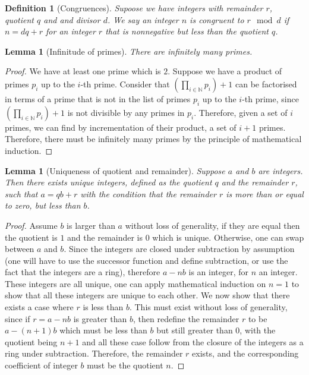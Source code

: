 \documentclass{tufte-book}
\newtheorem{definition}[theorem]{Definition}
\newtheorem{lemma}[theorem]{Lemma}
\begin{document}
\begin{definition}[Congruences]
	Supoose we have integers with remainder $r$, quotient $q$ and and divisor $d$.
	We say an integer $n$ is congruent to $r \mod d$ if $n = dq + r$ for an integer $r$ that is nonnegative but less than the quotient $q$.
\end{definition}

\begin{lemma}[Infinitude of primes]
	There are infinitely many primes.
\end{lemma}

\begin{proof}
	We have at least one prime which is $2$.
	Suppose we have a product of primes $p_{i}$ up to the $i$-th prime.
	Consider that $(\prod_{i \in \mathbb{N}} p_i) + 1$ can be factorised in terms
	of a prime that is not in the list of primes $p_{i}$ up to the $i$-th prime, since 
	$(\prod_{i \in \mathbb{N}} p_i) + 1$ is not divisible by any primes in $p_{i}$.
	Therefore, given a set of $i$ primes, we can find by incrementation of their product, a set of $i+1$ primes.
	Therefore, there must be infinitely many primes by the principle of mathematical induction.
\end{proof}

\begin{lemma}[Uniqueness of quotient and remainder]\label{lem:uniqueness-quot}
  Suppose $a$ and $b$ are integers. Then there exists unique integers, defined as the quotient $q$ and the remainder $r$, such that $a = qb + r$ with the condition that the remainder $r$ is more than or equal to zero, but less than $b$.
\end{lemma}

\begin{proof}
  Assume $b$ is larger than $a$ without loss of generality, if they are equal then the quotient is $1$ and the remainder is $0$ which is unique. Otherwise, one can swap between $a$ and $b$.
  Since the integers are closed under subtraction by assumption (one will have to use the successor function and define subtraction, or use the fact that the integers are a ring), therefore $a - nb$ is an integer, for $n$ an integer. These integers are all unique, one can apply mathematical induction on $n = 1$ to show that all these integers are unique to each other. We now show that there exists a case where $r$ is less than $b$. This must exist without loss of generality, since if $r = a - nb$ is greater than $b$, then redefine the remainder $r$ to be $a - (n+1)b$ which must be less than $b$ but still greater than $0$, with the quotient being $n+1$ and all these case follow from the closure of the integers as a ring under subtraction. Therefore, the remainder $r$ exists, and the corresponding coefficient of integer $b$ must be the quotient $n$.
\end{proof}
\end{document}
